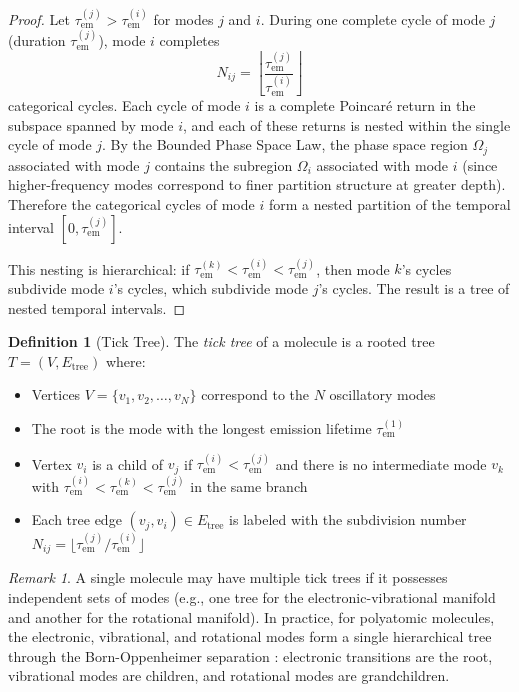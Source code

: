 \documentclass[11pt,a4paper]{article}
\theoremstyle{definition}
\newtheorem{definition}[theorem]{Definition}
\theoremstyle{remark}
\newtheorem{remark}[theorem]{Remark}
\newcommand{\tem}{\tau_{\mathrm{em}}}
\begin{document}
\begin{proof}
Let $\tem^{(j)} > \tem^{(i)}$ for modes $j$ and $i$. During one complete cycle of mode $j$ (duration $\tem^{(j)}$), mode $i$ completes
\begin{equation}
N_{ij} = \left\lfloor \frac{\tem^{(j)}}{\tem^{(i)}} \right\rfloor
\label{eq:subdivision}
\end{equation}
categorical cycles. Each cycle of mode $i$ is a complete Poincar\'{e} return in the subspace spanned by mode $i$, and each of these returns is nested within the single cycle of mode $j$. By the Bounded Phase Space Law, the phase space region $\Omega_j$ associated with mode $j$ contains the subregion $\Omega_i$ associated with mode $i$ (since higher-frequency modes correspond to finer partition structure at greater depth). Therefore the categorical cycles of mode $i$ form a nested partition of the temporal interval $[0, \tem^{(j)}]$.

This nesting is hierarchical: if $\tem^{(k)} < \tem^{(i)} < \tem^{(j)}$, then mode $k$'s cycles subdivide mode $i$'s cycles, which subdivide mode $j$'s cycles. The result is a tree of nested temporal intervals.
\end{proof}

\begin{definition}[Tick Tree]
\label{def:tick_tree}
The \emph{tick tree} of a molecule is a rooted tree $T = (V, E_{\mathrm{tree}})$ where:
\begin{itemize}[nosep]
\item Vertices $V = \{v_1, v_2, \ldots, v_N\}$ correspond to the $N$ oscillatory modes
\item The root is the mode with the longest emission lifetime $\tem^{(1)}$
\item Vertex $v_i$ is a child of $v_j$ if $\tem^{(i)} < \tem^{(j)}$ and there is no intermediate mode $v_k$ with $\tem^{(i)} < \tem^{(k)} < \tem^{(j)}$ in the same branch
\item Each tree edge $(v_j, v_i) \in E_{\mathrm{tree}}$ is labeled with the subdivision number $N_{ij} = \lfloor \tem^{(j)}/\tem^{(i)} \rfloor$
\end{itemize}
\end{definition}

\begin{remark}
A single molecule may have multiple tick trees if it possesses independent sets of modes (e.g., one tree for the electronic-vibrational manifold and another for the rotational manifold). In practice, for polyatomic molecules, the electronic, vibrational, and rotational modes form a single hierarchical tree through the Born-Oppenheimer separation \citep{bornoppenheimer1927}: electronic transitions are the root, vibrational modes are children, and rotational modes are grandchildren.
\end{remark}
\end{document}
